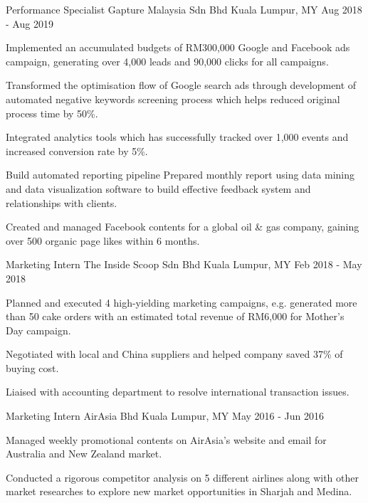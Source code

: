 \begin{cventries}
  \cventry
    {Performance Specialist} %
    {Gapture Malaysia Sdn Bhd} %
    {Kuala Lumpur, MY} %
    {Aug 2018 - Aug 2019} %
    {
      \begin{cvitems} %
        \item {Implemented an accumulated budgets of RM300,000 Google and Facebook ads campaign, generating over 4,000 leads and 90,000 clicks for all campaigns.}
        \item {Transformed the optimisation flow of Google search ads through development of automated negative keywords screening process which helps reduced original process time by 50\%.}
        \item {Integrated analytics tools which has successfully tracked over 1,000 events and increased conversion rate by 5\%.}
        \item {}
        \item {Build automated reporting pipeline Prepared monthly report using data mining and data visualization software to build effective feedback system and relationships with clients.}
        \item {Created and managed Facebook contents for a global oil \& gas company, gaining over 500 organic page likes within 6 months.}
      \end{cvitems}
    }

  \cventry
    {Marketing Intern} %
    {The Inside Scoop Sdn Bhd} %
    {Kuala Lumpur, MY} %
    {Feb 2018 - May 2018} %
    {
      \begin{cvitems} %
        \item {Planned and executed 4 high-yielding marketing campaigns, e.g. generated more than 50 cake orders with an estimated total revenue of RM6,000 for Mother’s Day campaign.}
        \item {Negotiated with local and China suppliers and helped company saved 37\% of buying cost. }
        \item {Liaised with accounting department to resolve international transaction issues.}
      \end{cvitems}
    }

  \cventry
    {Marketing Intern} %
    {AirAsia Bhd} %
    {Kuala Lumpur, MY} %
    {May 2016 - Jun 2016} %
    {
      \begin{cvitems} %
        \item {Managed weekly promotional contents on AirAsia’s website and email for Australia and New Zealand market.}
        \item {Conducted a rigorous competitor analysis on 5 different airlines along with other market researches to explore new market opportunities in Sharjah and Medina.}
      \end{cvitems}
    }

\end{cventries}
